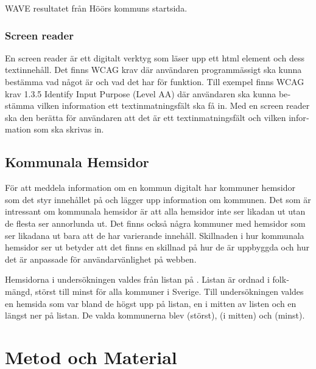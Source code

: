\documentclass[11p]{article}
\begin{document}
\begin{otherlanguage}{swedish}
\begin{center}
    WAVE resultatet från Höörs kommuns startsida.
    \end{center}

    \subsubsection{Screen reader}

    En screen reader är ett digitalt verktyg som läser upp ett html element och dess textinnehåll.
    Det finns WCAG krav där användaren programmässigt ska kunna bestämma vad något är och vad det har för funktion.
    Till exempel finns WCAG krav 1.3.5 Identify Input Purpose (Level AA) där användaren ska kunna bestämma vilken information ett textinmatningsfält ska få in.
    Med en screen reader ska den berätta för användaren att det är ett textinmatningsfält och vilken information som ska skrivas in.

    \subsection{Kommunala Hemsidor}
    För att meddela information om en kommun digitalt har kommuner hemsidor som det styr innehållet på och lägger upp information om kommunen.
    Det som är intressant om kommunala hemsidor är att alla hemsidor inte ser likadan ut utan de flesta ser annorlunda ut.
    Det finns också några kommuner med hemsidor som ser likadana ut bara att de har varierande innehåll.
    Skillnaden i hur kommunala hemsidor ser ut betyder att det finns en skillnad på hur de är uppbyggda och hur det är anpassade för användarvänlighet på webben.
    
    Hemsidorna i undersökningen valdes från listan på \textcite{SverigesKommuner}.
    Listan är ordnad i folkmängd, störst till minst för alla kommuner i Sverige.
    Till undersökningen valdes en hemsida som var bland de högst upp på listan, en i mitten av listen och en längst ner på listan.
    De valda kommunerna blev \textcite{Linköpings_kommun} (störst), \textcite{Höörs_kommun} (i mitten) och \textcite{Sorsele_kommun} (minst).
    
    \section{Metod och Material}


\end{otherlanguage}
\end{document}
